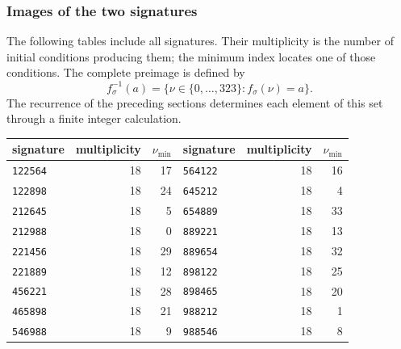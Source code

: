 \subsubsection{Images of the two signatures}

The following tables include all signatures. Their multiplicity is the
number of initial conditions producing them; the minimum index locates
one of those conditions. The complete preimage is defined by
\[
 f_\sigma^{-1}(a)=\{\nu\in\{0,\ldots,323\}:f_\sigma(\nu)=a\}.
\]
The recurrence of the preceding sections determines each element of this
set through a finite integer calculation.

\begin{tablacompleta}[htbp]
\caption{The eighteen additive signatures.}
\label{tpk:firmas-aditivas}
\begin{tabular}{@{}lrr@{\qquad}lrr@{}}
\toprule
signature&multiplicity&\(\nu_{\min}\)&signature&multiplicity&\(\nu_{\min}\)\\
\midrule
\texttt{122564}&18&17&\texttt{564122}&18&16\\
\texttt{122898}&18&24&\texttt{645212}&18&4\\
\texttt{212645}&18&5&\texttt{654889}&18&33\\
\texttt{212988}&18&0&\texttt{889221}&18&13\\
\texttt{221456}&18&29&\texttt{889654}&18&32\\
\texttt{221889}&18&12&\texttt{898122}&18&25\\
\texttt{456221}&18&28&\texttt{898465}&18&20\\
\texttt{465898}&18&21&\texttt{988212}&18&1\\
\texttt{546988}&18&9&\texttt{988546}&18&8\\
\bottomrule
\end{tabular}
\end{tablacompleta}

